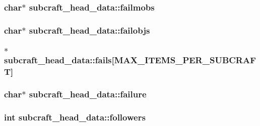 \hypertarget{structsubcraft__head__data_a67698fc5060906c45979b28bac24a0cf}{
\subsubsection[{failmobs}]{\setlength{\rightskip}{0pt plus 5cm}char$\ast$ subcraft\-\_\-head\-\_\-data\-::failmobs}}\label{structsubcraft__head__data_a67698fc5060906c45979b28bac24a0cf}
\hypertarget{structsubcraft__head__data_a325350eb5d9bfb322c3e306ef9a858f0}{
\subsubsection[{failobjs}]{\setlength{\rightskip}{0pt plus 5cm}char$\ast$ subcraft\-\_\-head\-\_\-data\-::failobjs}}\label{structsubcraft__head__data_a325350eb5d9bfb322c3e306ef9a858f0}
\hypertarget{structsubcraft__head__data_a3ec0b2d53c443fc93064ffd3877c8bbb}{
\subsubsection[{fails}]{$\ast$ subcraft\-\_\-head\-\_\-data\-::fails\mbox{[}{\bf M\-A\-X\-\_\-\-I\-T\-E\-M\-S\-\_\-\-P\-E\-R\-\_\-\-S\-U\-B\-C\-R\-A\-F\-T}\mbox{]}}}\label{structsubcraft__head__data_a3ec0b2d53c443fc93064ffd3877c8bbb}
\hypertarget{structsubcraft__head__data_a5686d182f49445e674c7d24db72df3c0}{
\subsubsection[{failure}]{\setlength{\rightskip}{0pt plus 5cm}char$\ast$ subcraft\-\_\-head\-\_\-data\-::failure}}\label{structsubcraft__head__data_a5686d182f49445e674c7d24db72df3c0}
\hypertarget{structsubcraft__head__data_adc6e3156783ca4c4e6b01b3cec6c3e22}{
\subsubsection[{followers}]{\setlength{\rightskip}{0pt plus 5cm}int subcraft\-\_\-head\-\_\-data\-::followers}}\label{structsubcraft__head__data_adc6e3156783ca4c4e6b01b3cec6c3e22}
